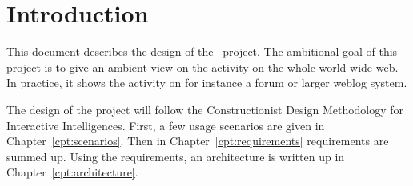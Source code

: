 \chapter{Introduction}

This document describes the design of the \AmbE\ project. The ambitional goal
of this project is to give an ambient view on the activity on the whole
world-wide web. In practice, it shows the activity on for instance a forum or
larger weblog system.

The design of the project will follow the Constructionist Design Methodology
for Interactive Intelligences\cite{CDM}. First, a few usage scenarios are given
in Chapter~\ref{cpt:scenarios}. Then in Chapter~\ref{cpt:requirements}
requirements are summed up. Using the requirements, an architecture is written
up in Chapter~\ref{cpt:architecture}.

